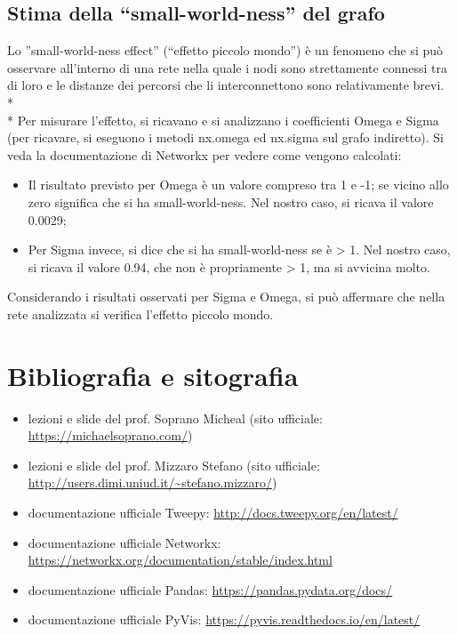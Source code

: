 \documentclass[a4paper, 12pt, twoside]{article}
\begin{document}
\subsection{Stima della “small-world-ness” del grafo}
Lo ”small-world-ness effect” (“effetto piccolo mondo”) è un fenomeno che si può osservare all’interno di una rete nella quale i nodi sono strettamente connessi tra di loro e le distanze dei percorsi che li interconnettono sono relativamente brevi. \\* \\*
Per misurare l'effetto, si ricavano e si analizzano i coefficienti Omega e Sigma (per ricavare, si eseguono i metodi nx.omega ed nx.sigma sul grafo indiretto). Si veda la documentazione di Networkx per vedere come vengono calcolati:
\begin{itemize}
    \item Il risultato previsto per Omega è un valore compreso tra 1 e -1; se vicino allo zero significa che si ha small-world-ness. Nel nostro caso, si ricava il valore 0.0029;
    \item Per Sigma invece, si dice che si ha small-world-ness se è > 1. Nel nostro caso, si ricava il valore 0.94, che non è propriamente > 1, ma si avvicina molto.
\end{itemize}
Considerando i risultati osservati per Sigma e Omega, si può affermare che nella rete analizzata si verifica l’effetto piccolo mondo.




\section{Bibliografia e sitografia}\label{sec:biblio_e_sito}
\begin{itemize}
    \item lezioni e slide del prof. Soprano Micheal (sito ufficiale: \url{https://michaelsoprano.com/})
    \item lezioni e slide del prof. Mizzaro Stefano (sito ufficiale: \url{http://users.dimi.uniud.it/~stefano.mizzaro/}) 
    \item documentazione ufficiale Tweepy: \url{http://docs.tweepy.org/en/latest/}
    \item documentazione ufficiale Networkx: \url{https://networkx.org/documentation/stable/index.html}
    \item documentazione ufficiale Pandas: \url{https://pandas.pydata.org/docs/}
    \item documentazione ufficiale PyVis: \url{https://pyvis.readthedocs.io/en/latest/}
\end{itemize}
\end{document}
